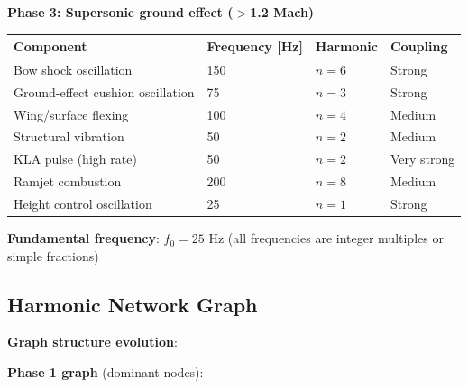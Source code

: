 \documentclass[12pt,a4paper]{article}
\begin{document}
\textbf{Phase 3: Supersonic ground effect ($>$1.2 Mach)}

\begin{center}
\begin{tabular}{|l|l|l|l|}
\hline
\textbf{Component} & \textbf{Frequency [Hz]} & \textbf{Harmonic} & \textbf{Coupling} \\
\hline
Bow shock oscillation & 150 & $n=6$ & Strong \\
Ground-effect cushion oscillation & 75 & $n=3$ & Strong \\
Wing/surface flexing & 100 & $n=4$ & Medium \\
Structural vibration & 50 & $n=2$ & Medium \\
KLA pulse (high rate) & 50 & $n=2$ & Very strong \\
Ramjet combustion & 200 & $n=8$ & Medium \\
Height control oscillation & 25 & $n=1$ & Strong \\
\hline
\end{tabular}
\end{center}

\textbf{Fundamental frequency}: $f_0 = 25$ Hz (all frequencies are integer multiples or simple fractions)

\subsection{Harmonic Network Graph}

\textbf{Graph structure evolution}:

\textbf{Phase 1 graph} (dominant nodes):
\begin{center}
\end{center}
\end{document}
